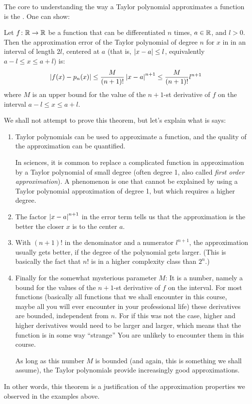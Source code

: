 The core to understanding the way a Taylor polynomial approximates a
function is the . One can show:
\begin{thm}
Let $f\colon{\mathbb R}\to{\mathbb R}$ be  a function that can be differentiated $n$ times,
$a\in{\mathbb R}$, and $l>0$.
Then the approximation error of the Taylor polynomial of degree $n$ for
$x$ in in an interval of length $2l$, centered at $a$ (that is,
$\left|x-a\right|\le l$, equivalently $a-l\le x\le a+l$) is:
\[
\left|f(x)-p_n(x)\right|\le \frac{M}{(n+1)!}\left|x-a\right|^{n+1}\le \frac{M}{(n+1)!}l^{n+1}
\]
where $M$ is an upper bound for the value of the $n+1$-st derivative of $f$
on the interval $a-l\le x\le a+l$.
\end{thm}
We shall not attempt to prove this theorem, but let's explain what is says:
\begin{enumerate}
\item
Taylor polynomials can be used to approximate a function, and the quality of
the approximation can be quantified.

In sciences, it is common to replace a complicated function in
approximation by a Taylor polynomial of small degree (often degree 1, also
called {\em first order approximation}). A
 phenomenon is one that cannot be explained by using a
Taylor polynomial approximation of degree 1, but which requires a higher
degree.
\item 
The factor $\left|x-a\right|^{n+1}$ in the error term tells us that the
approximation is the better the closer $x$ is to the center $a$.
\item
With $(n+1)!$ in the denominator and a numerator $l^{n+1}$, the
approximation usually gets better, if the degree of the polynomial gets
larger. (This is basically the fact that $n!$ is in a higher complexity
class than $2^n$.)

\item
Finally for the somewhat mysterious parameter $M$: It is a number, namely a
bound for the values of the $n+1$-st derivative of $f$ on the interval. For
most functions (basically all functions that we shall encounter in this
course, maybe all you will ever encounter in your professional life) these
derivatives are bounded, independent from $n$. For if this was not the case,
higher and higher derivatives would need to be larger and larger, which
means that the function is in some way ``strange'' You are unlikely to encounter them in this course.

As long as this number $M$ is bounded (and again, this is something we shall
assume), the Taylor polynomials provide increasingly good approximations.
\end{enumerate}
In other words, this theorem is a justification of the approximation
properties we observed in the examples above.\smallskip

